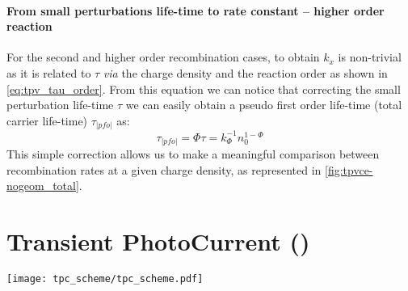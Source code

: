 \paragraph{From small perturbations life\hyp{}time to rate constant -- higher order reaction}
For the second and higher order recombination cases, to obtain $k_x$ is non-trivial as it is related to $\tau$ \textsl{via} the charge density \cite{ORegan2007} and the reaction order \cite{Shuttle2008,Du2018,Barnes2011,Barnes2011a} as shown in \cref{eq:tpv_tau_order}.
From this equation we can notice that correcting the small perturbation life\hyp{}time $\tau$ we can easily obtain a pseudo first order life\hyp{}time (total carrier life\hyp{}time) $\tau_|pfo|$ as:
\begin{equation}\label{eq:tau_pfo}
\tau_|pfo| = \Phi \tau = k_\Phi^{-1} n_0^{1-\Phi}
\end{equation}
This simple correction allows us to make a meaningful comparison between recombination rates at a given charge density, as represented in \cref{fig:tpvce-nogeom_total}.

\FloatBarrier
\newpage
\section{Transient PhotoCurrent ()}\label{characterization_tpc}

\begin{SCfigure}
	\centering
	\texttt{[image: tpc\_scheme/tpc\_scheme.pdf]}
	\label{fig:tpc_scheme}
\end{SCfigure}


